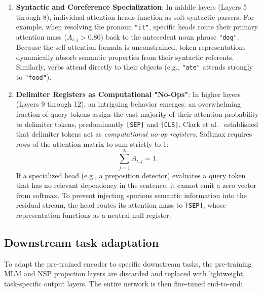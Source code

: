 \documentclass[../../main.tex]{subfiles}
\begin{document}
\begin{enumerate}
    \item \textbf{Syntactic and Coreference Specialization}: In middle layers (Layers 5 through 8), individual attention heads function as soft syntactic parsers. For example, when resolving the pronoun \texttt{"it"}, specific heads route their primary attention mass ($A_{i,j} > 0.80$) back to the antecedent noun phrase \texttt{"dog"}. Because the self-attention formula is unconstrained, token representations dynamically absorb semantic properties from their syntactic referents. Similarly, verbs attend directly to their objects (e.g., \texttt{"ate"} attends strongly to \texttt{"food"}).
    
    \item \textbf{Delimiter Registers as Computational "No-Ops"}: In higher layers (Layers 9 through 12), an intriguing behavior emerges: an overwhelming fraction of query tokens assign the vast majority of their attention probability to delimiter tokens, predominantly \texttt{[SEP]} and \texttt{[CLS]}. Clark et al.~\cite{clark2019what} established that delimiter tokens act as \emph{computational no-op registers}. Softmax requires rows of the attention matrix to sum strictly to 1:
    \begin{equation}
    \sum_{j=1}^N A_{i,j} = 1.
    \label{eq:softmax_row_sum_one}
    \end{equation}
    If a specialized head (e.g., a preposition detector) evaluates a query token that has no relevant dependency in the sentence, it cannot emit a zero vector from softmax. To prevent injecting spurious semantic information into the residual stream, the head routes its attention mass to \texttt{[SEP]}, whose representation functions as a neutral null register.
\end{enumerate}


\subsection{Downstream task adaptation}
\label{subsec:bert_downstream_finetuning}

To adapt the pre-trained encoder to specific downstream tasks, the pre-training MLM and NSP projection layers are discarded and replaced with lightweight, task-specific output layers. The entire network is then fine-tuned end-to-end:
\end{document}
